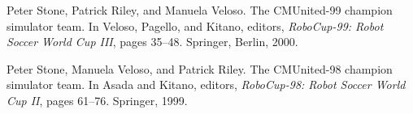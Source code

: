 \documentclass[ComputerScience]{vita}
\begin{document}
\begin{vita}
\begin{Publications}
   \item
    Peter Stone, Patrick Riley, and Manuela Veloso.
    \newblock The {CMU}nited-99 champion simulator team.
    \newblock In Veloso, Pagello, and Kitano, editors, {\em {R}obo{C}up-99: Robot
      Soccer World Cup III}, pages 35--48. Springer, Berlin, 2000.

   \item
    Peter Stone, Manuela Veloso, and Patrick Riley.
    \newblock The {CMU}nited-98 champion simulator team.
    \newblock In Asada and Kitano, editors, {\em {R}obo{C}up-98: Robot Soccer World
      Cup II}, pages 61--76. Springer, 1999.

    
  \end{Publications}
  


\end{vita}
\end{document}
